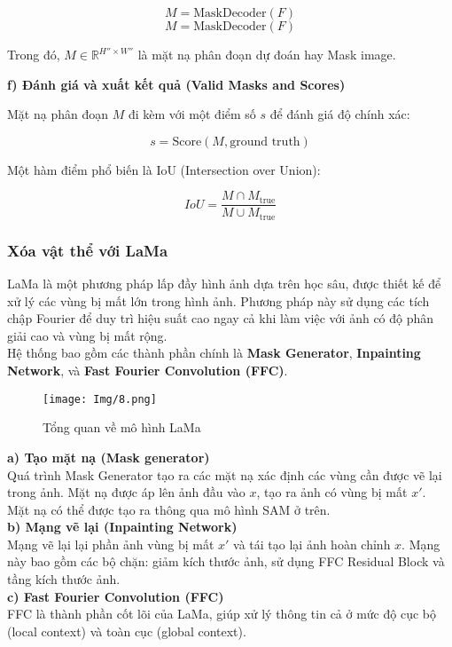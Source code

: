 \documentclass[12pt]{report}
\begin{document}
\[
M = \text{MaskDecoder}(F)
\]
\[
M = \text{MaskDecoder}(F)
\]

Trong đó, \( M \in \mathbb{R}^{H'' \times W''} \) là mặt nạ phân đoạn dự đoán hay Mask image.

\textbf{f) Đánh giá và xuất kết quả (Valid Masks and Scores)} 

Mặt nạ phân đoạn \( M \) đi kèm với một điểm số \( s \) để đánh giá độ chính xác:

\[
s = \text{Score}(M, \text{ground truth})
\]

Một hàm điểm phổ biến là IoU (Intersection over Union):

\[
IoU = \frac{M \cap M_{\text{true}}}{M \cup M_{\text{true}}}
\]

\subsubsection*{Xóa vật thể với LaMa}

LaMa là một phương pháp lấp đầy hình ảnh dựa trên học sâu, được thiết kế để xử lý các vùng bị mất lớn trong hình ảnh. Phương pháp này sử dụng các tích chập Fourier để duy trì hiệu suất cao ngay cả khi làm việc với ảnh có độ phân giải cao và vùng bị mất rộng.\\
Hệ thống bao gồm các thành phần chính là \textbf{Mask Generator}, \textbf{Inpainting Network}, và \textbf{Fast Fourier Convolution (FFC)}.\\
\begin{figure}[H]
\centering
\texttt{[image: Img/8.png]}
\caption{Tổng quan về mô hình LaMa}
\end{figure}
\textbf{a) Tạo mặt nạ (Mask generator)} \\
Quá trình Mask Generator tạo ra các mặt nạ xác định các vùng cần được vẽ lại trong ảnh. Mặt nạ được áp lên ảnh đầu vào $x$, tạo ra ảnh có vùng bị mất $x'$.\\
Mặt nạ có thể được tạo ra thông qua mô hình SAM ở trên.\\
\textbf{b) Mạng vẽ lại (Inpainting Network)} \\
Mạng vẽ lại lại phần ảnh vùng bị mất $x'$ và tái tạo lại ảnh hoàn chỉnh $x$. Mạng này bao gồm các bộ chặn: giảm kích thước ảnh, sử dụng FFC Residual Block và tầng kích thước ảnh.\\
\textbf{c) Fast Fourier Convolution (FFC)} \\
FFC là thành phần cốt lõi của LaMa, giúp xử lý thông tin cả ở mức độ cục bộ (local context) và toàn cục (global context).
\end{document}
